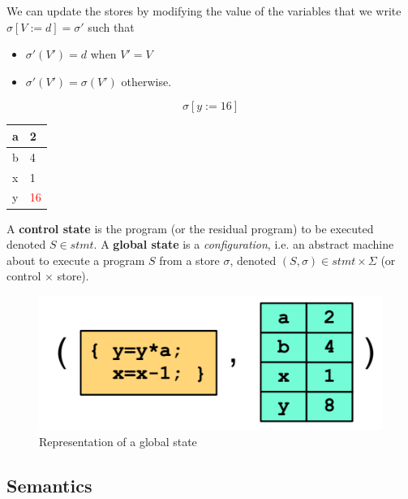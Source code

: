 \documentclass[12pt, a4paper]{book}
\begin{document}
We can update the stores by modifying the value of the variables that we
write $\sigma[V := d] = \sigma'$ such that

\begin{itemize}
    \item $\sigma'(V') = d$ when $V' =V$
    \item $\sigma'(V') = \sigma(V')$ otherwise.
\end{itemize}

\begin{minipage}{\linewidth}
    \begin{minipage}{0.4\linewidth}
        $$\sigma[y := 16]$$
    \end{minipage}
    \begin{minipage}{0.4\linewidth}
        \centering
        \begin{tabular}{ll}
            \toprule
            a & 2 \\
            \midrule
            b & 4 \\
            \midrule
            x & 1 \\
            \midrule
            y & \textcolor{red}{16} \\
            \bottomrule
        \end{tabular}
    \end{minipage}
\end{minipage}

A \textbf{control state} is the program (or the residual program) to be executed
denoted $S \in stmt$. A \textbf{global state} is a \textit{configuration}, i.e.
an abstract machine about to execute a program $S$ from a store $\sigma$,
denoted $(S,\sigma) \in stmt \times \Sigma$ (or control $\times$ store).

\begin{figure}[!ht]
    \centering
    \includegraphics[width=0.5\linewidth]{global_state.png}
    \caption{Representation of a global state}
\end{figure}

\subsection{Semantics}
\label{sub:Semantics}
\end{document}
